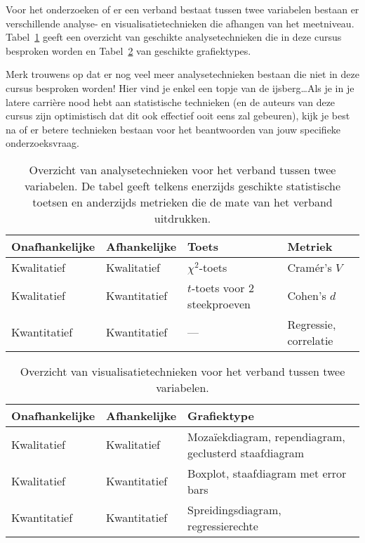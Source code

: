 Voor het onderzoeken of er een verband bestaat tussen twee variabelen bestaan er verschillende analyse- en visualisatietechnieken die afhangen van het meetniveau. Tabel~\ref{tab:analyse2var} geeft een overzicht van geschikte analysetechnieken die in deze cursus besproken worden en Tabel~\ref{tab:visualisatie2var} van geschikte grafiektypes.

Merk trouwens op dat er nog veel meer analysetechnieken bestaan die niet in deze cursus besproken worden! Hier vind je enkel een topje van de ijsberg\ldots Als je in je latere carrière nood hebt aan statistische technieken (en de auteurs van deze cursus zijn optimistisch dat dit ook effectief ooit eens zal gebeuren), kijk je best na of er betere technieken bestaan voor het beantwoorden van jouw specifieke onderzoeksvraag.

\begin{table}
  \begin{tabular}{llll}
    \toprule
    \textbf{Onafhankelijke} & \textbf{Afhankelijke} & \textbf{Toets}                & \textbf{Metriek}      \\
    \midrule
    Kwalitatief             & Kwalitatief           & $\chi^2$-toets                & Cramér's $V$          \\
    Kwalitatief             & Kwantitatief          & $t$-toets voor 2 steekproeven & Cohen's $d$           \\
    Kwantitatief            & Kwantitatief          & ---                           & Regressie, correlatie \\
    \bottomrule
  \end{tabular}
  \caption{Overzicht van analysetechnieken voor het verband tussen twee variabelen. De tabel geeft telkens enerzijds geschikte statistische toetsen en anderzijds metrieken die de mate van het verband uitdrukken.}
  \label{tab:analyse2var}
\end{table}

\begin{table}
  \begin{tabular}{lll}
  	\toprule
  	\textbf{Onafhankelijke} & \textbf{Afhankelijke} & \textbf{Grafiektype}                                  \\
  	\midrule
  	Kwalitatief             & Kwalitatief           & Mozaïekdiagram, rependiagram, geclusterd staafdiagram \\
  	Kwalitatief             & Kwantitatief          & Boxplot, staafdiagram met error bars                  \\
  	Kwantitatief            & Kwantitatief          & Spreidingsdiagram, regressierechte                    \\
  	\bottomrule
  \end{tabular}
  \caption{Overzicht van visualisatietechnieken voor het verband tussen twee variabelen.}
  \label{tab:visualisatie2var}
\end{table}

